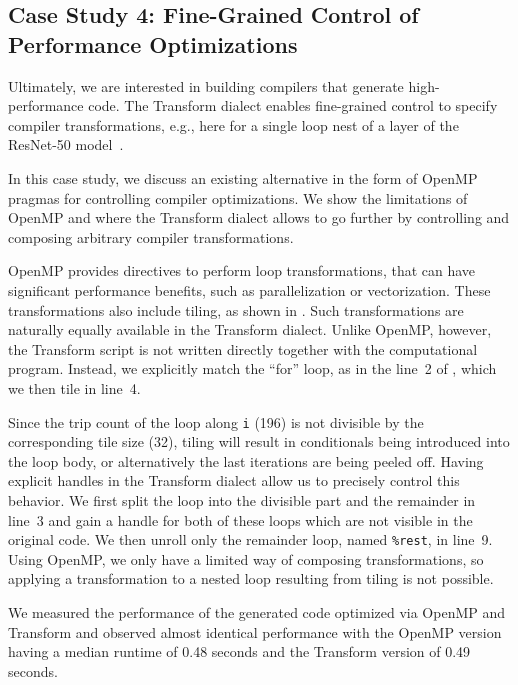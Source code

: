 \documentclass[screen,nonacm,authorversion]{acmart}
\begin{document}
\subsection{Case Study 4: Fine-Grained Control of Performance Optimizations}
\label{sec:casestudy4}
Ultimately, we are interested in building compilers that generate high-performance code.
The Transform dialect enables fine-grained control to specify compiler transformations, e.g., here for a single loop nest of a layer of the ResNet-50 model~\cite{he2015deep}. %

In this case study, we discuss an existing alternative in the form of OpenMP pragmas for controlling compiler optimizations.
We show the limitations of OpenMP and where the Transform dialect allows to go further by controlling and composing arbitrary compiler transformations.




OpenMP provides directives to perform loop transformations, that can have significant performance benefits, such as parallelization or vectorization.
These transformations also include tiling, as shown in .
Such transformations are naturally equally available in the Transform dialect.
Unlike OpenMP, however, the Transform script is not written directly together with the computational program.
Instead, we explicitly match the ``for'' loop, as in the line~2 of , which we then tile in line~4.




Since the trip count of the loop along \texttt{i} (196) is not divisible by the corresponding tile size (32), tiling will result in conditionals being introduced into the loop body, or alternatively the last iterations are being peeled off.
Having explicit handles in the Transform dialect allow us to precisely control this behavior.
We first split the loop into the divisible part and the remainder in line~3 and gain a handle for both of these loops which are not visible in the original code.
We then unroll only the remainder loop, named \texttt{\%rest}, in line~9.
Using OpenMP, we only have a limited way of composing transformations, so applying a transformation to a nested loop resulting from tiling is not possible.

We measured the performance of the generated code optimized via OpenMP and Transform and observed almost identical performance with the OpenMP version having a median runtime of 0.48 seconds and the Transform version of 0.49 seconds.
\end{document}
